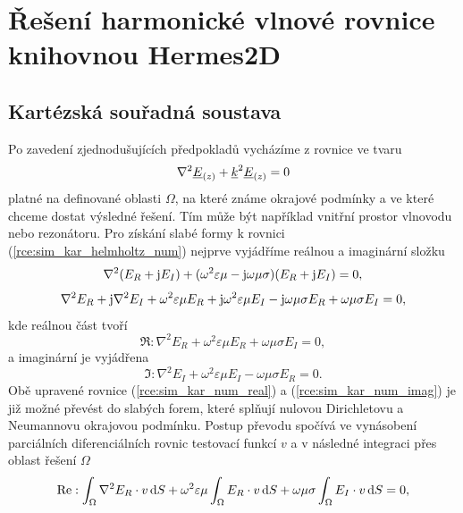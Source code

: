\section{Řešení harmonické vlnové rovnice knihovnou Hermes2D} \label{sec:sim_hermes2d}
\subsection{Kartézská souřadná soustava} \label{subsec:sim_kar}
Po zavedení zjednodušujících předpokladů vycházíme z rovnice ve tvaru
\begin{equation}
	\nabla^{2}{\underline{E}}_{(z)} +{\underline{k}}^{2}{\underline{E}}_{(z)} = 0
	\label{rce:sim_kar_helmholtz_num} 
\end{equation}
platné na definované oblasti $\Omega$, na které známe okrajové podmínky a ve které chceme dostat výsledné řešení. Tím může být například vnitřní prostor vlnovodu nebo rezonátoru. Pro získání slabé formy k rovnici (\ref{rce:sim_kar_helmholtz_num}) nejprve vyjádříme reálnou a imaginární složku
\begin{displaymath}
	\nabla^{2}(E_R + \mathrm{j} E_I) + (\omega^{2}\varepsilon\mu - \mathrm{j}\omega\mu\sigma)(E_R + \mathrm{j} E_I) = 0,
\end{displaymath}
\begin{displaymath}
	\nabla^{2} E_R + \mathrm{j}\nabla^{2} E_I + \omega^{2}\varepsilon\mu E_R + \mathrm{j}\omega^{2}\varepsilon\mu E_I - \mathrm{j}\omega\mu\sigma E_R + \omega\mu\sigma E_I = 0,
\end{displaymath}
kde reálnou část tvoří
\begin{equation}
	\Re : \nabla^{2} E_R + \omega^{2}\varepsilon\mu E_R + \omega\mu\sigma E_I = 0,
	\label{rce:sim_kar_num_real} 
\end{equation}
a imaginární je vyjádřena
\begin{equation}
	\Im : \nabla^{2} E_I + \omega^{2}\varepsilon\mu E_I - \omega\mu\sigma E_R = 0.
	\label{rce:sim_kar_num_imag} 
\end{equation}
Obě upravené rovnice (\ref{rce:sim_kar_num_real}) a (\ref{rce:sim_kar_num_imag}) je již možné převést do slabých forem, které splňují nulovou Dirichletovu a Neumannovu okrajovou podmínku. Postup převodu spočívá ve vynásobení parciálních diferenciálních rovnic testovací funkcí $v$ a v následné integraci přes oblast řešení $\Omega$ 
\begin{equation}
	\mathrm{Re} : \int_{\Omega}\nabla^{2} E_R\cdot v \,\mathrm{d} S + \omega^{2}\varepsilon\mu\int_{\Omega} E_R\cdot v\,\mathrm{d} S + \omega\mu\sigma\int_{\Omega} E_I\cdot v\,\mathrm{d} S = 0,
	\label{rce:sim_kar_weak_odv_real} 
\end{equation}
